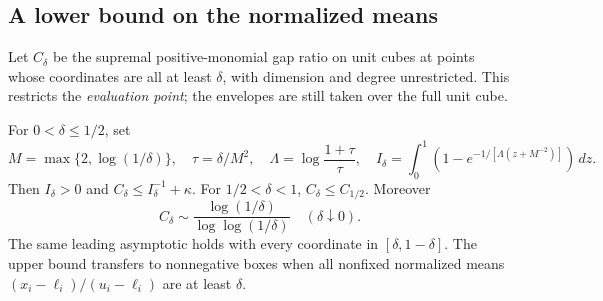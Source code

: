 \subsection{A lower bound on the normalized means}
Let $C_\delta$ be the supremal positive-monomial gap ratio on unit cubes
at points whose coordinates are all at least $\delta$, with dimension
and degree unrestricted. This restricts the \emph{evaluation point}; the
envelopes are still taken
over the full unit cube.

\begin{theorem}\label{thm:marginal-floor}
For $0<\delta\le1/2$, set
\[
 M=\max\{2,\log(1/\delta)\},\quad \tau=\delta/M^2,\quad
 \Lambda=\log\frac{1+\tau}{\tau},\quad
 I_\delta=\int_0^1\left(1-e^{-1/[\Lambda(z+M^{-2})]}\right)\,dz.
\]
Then $I_\delta>0$ and $C_\delta\le I_\delta^{-1}+\kappa$.
For $1/2<\delta<1$, $C_\delta\le C_{1/2}$. Moreover
\[
 C_\delta\sim\frac{\log(1/\delta)}{\log\log(1/\delta)}
 \quad(\delta\downarrow0).
\]
The same leading asymptotic holds with every coordinate in
$[\delta,1-\delta]$. The upper bound transfers to nonnegative boxes when
all nonfixed normalized means $(x_i-\ell_i)/(u_i-\ell_i)$ are at least
$\delta$.
\end{theorem}
